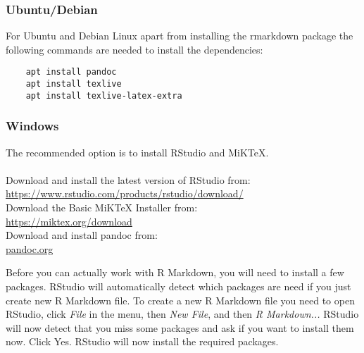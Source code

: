\subsubsection{Ubuntu/Debian}

For Ubuntu and Debian Linux apart from installing the rmarkdown package the following commands are needed to install the dependencies:

\begin{verbatim}
    apt install pandoc
    apt install texlive
    apt install texlive-latex-extra
\end{verbatim}

\subsubsection{Windows}

The recommended option is to install RStudio and MiKTeX.\\ \\
Download and install the latest version of RStudio from: \\
\url{https://www.rstudio.com/products/rstudio/download/} \\
Download the Basic MiKTeX Installer from: \\
\url{https://miktex.org/download} \\
Download and install pandoc from: \\
\url{pandoc.org}

Before you can actually work with R Markdown, you will need to install a few packages. RStudio will automatically detect which packages are need if you just create new R Markdown file. To create a new R Markdown file you need to open RStudio, click {\it File} in the menu, then {\it New File}, and then {\it R Markdown...} RStudio will now detect that you miss some packages and ask if you want to install them now. Click Yes. RStudio will now install the required packages.


